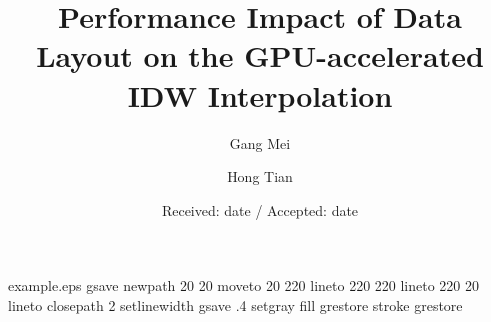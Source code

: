 \begin{filecontents*}{example.eps}
gsave
newpath
  20 20 moveto
  20 220 lineto
  220 220 lineto
  220 20 lineto
closepath
2 setlinewidth
gsave
  .4 setgray fill
grestore
stroke
grestore
\end{filecontents*}
\RequirePackage{fix-cm}
\documentclass[twocolumn]{svjour3}          \smartqed  \usepackage{graphicx}

\usepackage{times}
\usepackage{subfigure}
\usepackage[hyphens]{url}

\usepackage{enumitem}
\renewcommand{\labelitemi}{}

\usepackage[
bookmarksnumbered = true,
bookmarksopen = true,
bookmarksopenlevel=3,
pdftitle={Performance Impact of Data Layout on the GPU-accelerated IDW Interpolation},
pdfauthor={Gang Mei},
pdfstartview = FitH,
colorlinks=true,
linkcolor=blue,
breaklinks=true,
urlcolor=black,
citecolor=blue
]{hyperref}



\title{Performance Impact of Data Layout on the GPU-accelerated \\IDW Interpolation}


\author{Gang Mei         \and
        Hong Tian   
}



\date{Received: date / Accepted: date}


\maketitle

